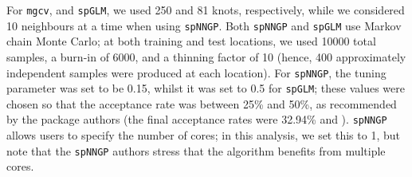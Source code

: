 For \texttt{mgcv}, 
and \texttt{spGLM}, we used 250 and 81 knots, respectively,  
while we considered 10 neighbours at a time when using \texttt{spNNGP}.
Both \texttt{spNNGP} and \texttt{spGLM} use Markov chain Monte Carlo;  
at both training and test locations, we used 10000 total samples, a burn-in of 6000, and a thinning factor of 10 (hence, 400 approximately independent samples were produced at each location). 
For \texttt{spNNGP}, the tuning parameter was set to be 0.15, whilst it was set to 0.5 for \texttt{spGLM}; these values were chosen so that the acceptance rate was between 25\% and 50\%, as recommended by the package authors (the final acceptance rates were 32.94\% and ). 
\texttt{spNNGP} allows users to specify the number of cores; in this analysis, we set this to 1, but note that the \texttt{spNNGP} authors stress that the algorithm benefits from multiple cores.






